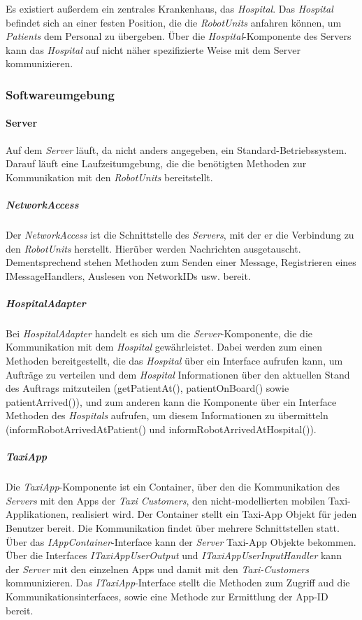     Es existiert außerdem ein zentrales Krankenhaus, das \emph{Hospital}.
    Das \emph{Hospital} befindet sich an einer festen Position, die die \emph{RobotUnits} anfahren können, um \emph{Patients} dem Personal zu übergeben.
    Über die \emph{Hospital}-Komponente des Servers kann das \emph{Hospital} auf nicht näher spezifizierte Weise mit dem Server kommunizieren.

  \subsubsection{Softwareumgebung}

    \paragraph{Server}\label{server}
    		Auf dem \emph{Server} läuft, da nicht anders angegeben, ein Standard-Betriebssystem.
    		Darauf läuft eine Laufzeitumgebung, die die benötigten Methoden zur Kommunikation mit den \emph{RobotUnits} bereitstellt.
    	\subparagraph{NetworkAccess}\label{networkaccess}
    		Der \emph{NetworkAccess} ist die Schnittstelle des \emph{Servers}, mit der er die Verbindung zu den \emph{RobotUnits} herstellt.
        Hierüber werden Nachrichten ausgetauscht.
    		Dementsprechend stehen Methoden zum Senden einer Message, Registrieren eines IMessageHandlers, Auslesen von NetworkIDs usw. bereit.
    	\subparagraph{HospitalAdapter}\label{hospital}
    		Bei \emph{HospitalAdapter} handelt es sich um die \emph{Server}-Komponente, die die Kommunikation mit dem \emph{Hospital} gewährleistet.
    		Dabei werden zum einen Methoden bereitgestellt, die das \emph{Hospital} über ein Interface aufrufen kann, um Aufträge zu verteilen und dem \emph{Hospital} Informationen über den aktuellen Stand des Auftrags mitzuteilen (getPatientAt(), patientOnBoard() sowie patientArrived()), und zum anderen kann die Komponente über ein Interface Methoden des \emph{Hospitals} aufrufen, um diesem Informationen zu übermitteln (informRobotArrivedAtPatient() und informRobotArrivedAtHospital()).
      \subparagraph{TaxiApp}
        Die \emph{TaxiApp}-Komponente ist ein Container, über den die Kommunikation des \emph{Servers} mit den Apps der \emph{Taxi Customers}, den nicht-modellierten mobilen Taxi-Applikationen, realisiert wird.
        Der Container stellt ein Taxi-App Objekt für jeden Benutzer bereit.
        Die Kommunikation findet über mehrere Schnittstellen statt.
        Über das \emph{IAppContainer}-Interface kann der \emph{Server} Taxi-App Objekte bekommen.
        Über die Interfaces \emph{ITaxiAppUserOutput} und \emph{ITaxiAppUserInputHandler} kann der \emph{Server} mit den einzelnen Apps und damit mit den \emph{Taxi-Customers} kommunizieren.
        Das \emph{ITaxiApp}-Interface stellt die Methoden zum Zugriff aud die Kommunikationsinterfaces, sowie eine Methode zur Ermittlung der App-ID bereit.
